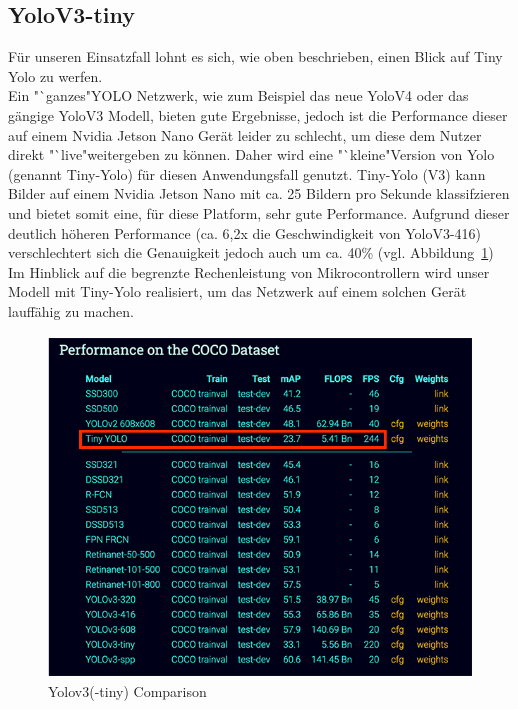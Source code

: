 \documentclass[a4paper,oneside,12pt]{report}
\begin{document}
\begin{onehalfspace}
		\subsection{YoloV3-tiny}
		Für unseren Einsatzfall lohnt es sich, wie oben beschrieben, einen Blick auf Tiny Yolo zu werfen. \\
		Ein "`ganzes"\space YOLO Netzwerk, wie zum Beispiel das neue YoloV4 oder das gängige YoloV3 Modell, bieten gute Ergebnisse, jedoch ist die Performance dieser auf einem Nvidia Jetson Nano Gerät leider zu schlecht, um diese dem Nutzer direkt "`live"\space weitergeben zu können.
		Daher wird eine "`kleine"\space Version von Yolo (genannt Tiny-Yolo) für diesen Anwendungsfall genutzt. Tiny-Yolo (V3) kann Bilder auf einem Nvidia Jetson Nano mit ca. 25 Bildern pro Sekunde klassifzieren und bietet somit eine, für diese Platform, sehr gute Performance.\clearpage
		Aufgrund dieser deutlich höheren Performance (ca. 6,2x die Geschwindigkeit von YoloV3-416) verschlechtert sich die Genauigkeit jedoch auch um ca. 40\% (vgl. Abbildung~\ref{fig:yolov3-tiny}) \\
		Im Hinblick auf die begrenzte Rechenleistung von Mikrocontrollern wird unser Modell mit Tiny-Yolo realisiert, um das Netzwerk auf einem solchen Gerät lauffähig zu machen.
		\begin{figure}[h!]
			\includegraphics[scale=0.7]{YoloV3-tiny.png}
			\caption{Yolov3(-tiny) Comparison}
			\label{fig:yolov3-tiny}
		\end{figure}
	\end{onehalfspace}
\end{document}
